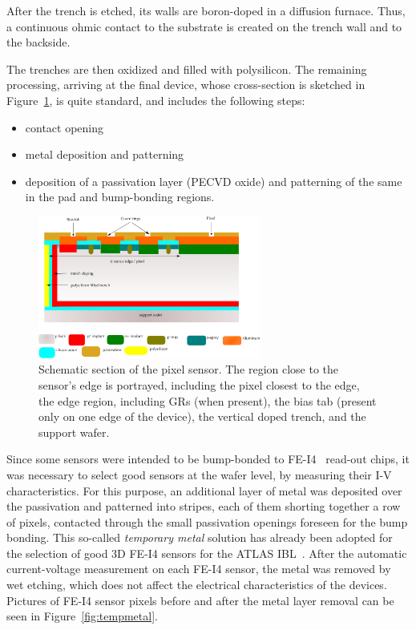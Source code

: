 After the trench is etched, its walls are boron-doped in a diffusion furnace.
Thus, a continuous ohmic contact to the substrate  is created on the trench wall and to the backside.

The trenches are then oxidized and filled with polysilicon.
The remaining processing, arriving at the final device, whose cross-section is sketched in Figure~\ref{fig:pixel},
is quite standard, and includes the following steps:
\begin{itemize}
\item contact opening
\item metal deposition and patterning
\item deposition of a passivation layer  (PECVD  oxide)  and patterning of the same in the
 pad and bump-bonding regions.
\end{itemize}

\begin{figure}[!htpb]
\begin{center}
\includegraphics[width=0.65\textwidth]{pixel_design_v3.png}
\caption{\label{fig:pixel}Schematic section of the pixel sensor. The region close to the sensor's edge is portrayed, including the pixel closest to the edge,
the edge region, including GRs (when present), the bias tab (present only on one edge of the device), the vertical doped trench, and the support wafer.}
\end{center}
\end{figure}

Since some sensors were intended to  be bump-bonded to  FE-I4~\cite{FEI4} read-out chips, 
it was necessary to select good sensors at the wafer level, by measuring their I-V characteristics.
 For this purpose, an additional layer of metal was deposited over the passivation and patterned into stripes, each of them shorting together a row of pixels, contacted through
 the small passivation openings foreseen for the bump bonding.
This so-called {\it temporary metal} solution has already been adopted for the selection of good 3D FE-I4 sensors for the ATLAS IBL~\cite{bib:metal}.
After the automatic current-voltage  measurement
 on each FE-I4 sensor, the metal was removed by  wet etching, which does not affect the electrical characteristics  of the devices.
Pictures of FE-I4 sensor pixels before and after the metal layer removal can be seen in Figure~\ref{fig:tempmetal}.

